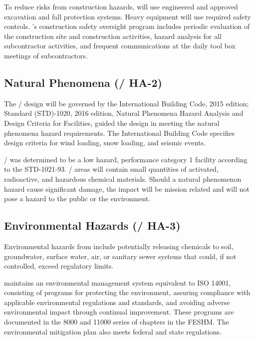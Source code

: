 To reduce risks from construction hazards, \fnal will use
engineered and approved excavation and fall protection systems.  Heavy
equipment will use required safety controls. \fnal's
construction safety oversight program includes periodic evaluation of
the construction site and construction activities, hazard analysis for
all subcontractor activities, and frequent  communications at the
daily tool box meetings of subcontractors.

\subsection{Natural Phenomena (/ HA-2)}

The / design will be governed by the International Building
Code, 2015 edition;  Standard (STD)-1020, 2016 edition,
Natural Phenomena Hazard Analysis and Design Criteria for 
Facilities, guided the design in meeting the
natural phenomena hazard requirements.  The International Building Code specifies design
criteria for wind loading, snow loading, and seismic events.

/ was determined to be a low hazard,
performance category 1 facility according to the 
STD-1021-93. / areas will contain small
quantities of activated, radioactive, and hazardous chemical
materials. Should a natural phenomenon hazard cause significant
damage, the impact will be mission related and will not pose a hazard
to the public or the environment.

\subsection{Environmental Hazards (/ HA-3)}

Environmental hazards from  include potentially releasing
chemicals to soil, groundwater, surface water, air, or sanitary sewer
systems that could, if not controlled, exceed regulatory limits.

\fnal maintains an environmental management system equivalent to
ISO 14001, consisting of programs for protecting the environment,
assuring compliance with applicable environmental regulations and
standards, and avoiding adverse environmental impact through continual improvement.  These programs are documented in the 8000
and 11000 series of chapters in the FESHM.  The environmental
mitigation plan also meets federal and state regulations.



